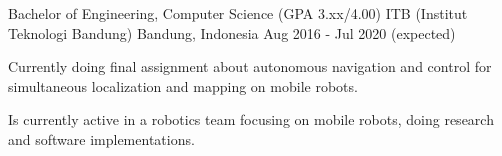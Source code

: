 

\begin{cventries}

  \cventry
    {Bachelor of Engineering, Computer Science (GPA 3.xx/4.00)} %
    {ITB (Institut Teknologi Bandung)} %
    {Bandung, Indonesia} %
    {Aug 2016 - Jul 2020 (expected)} %
    {
   	  \begin{cvitems}
		  \item {Currently doing final assignment about autonomous navigation and control for simultaneous localization and mapping on mobile robots.}
          \item {Is currently active in a robotics team focusing on mobile robots, doing research and software implementations.}
   	  \end{cvitems}
    }

\end{cventries}
